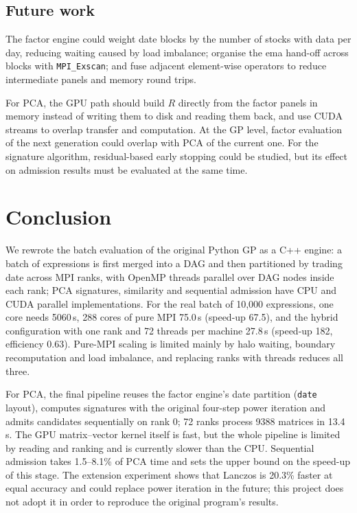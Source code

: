 \documentclass[11pt,a4paper]{article}
\newcommand{\code}[1]{\texttt{#1}}
\begin{document}
\subsection{Future work}
The factor engine could weight date blocks by the number of stocks with data per day, reducing waiting caused by load imbalance; organise the ema hand-off across blocks with \code{MPI\_Exscan}; and fuse adjacent element-wise operators to reduce intermediate panels and memory round trips.

For PCA, the GPU path should build $R$ directly from the factor panels in memory instead of writing them to disk and reading them back, and use CUDA streams to overlap transfer and computation. At the GP level, factor evaluation of the next generation could overlap with PCA of the current one. For the signature algorithm, residual-based early stopping could be studied, but its effect on admission results must be evaluated at the same time.

\section{Conclusion}
We rewrote the batch evaluation of the original Python GP as a C++ engine: a batch of expressions is first merged into a DAG and then partitioned by trading date across MPI ranks, with OpenMP threads parallel over DAG nodes inside each rank; PCA signatures, similarity and sequential admission have CPU and CUDA parallel implementations. For the real batch of 10{,}000 expressions, one core needs 5060\,s, 288 cores of pure MPI 75.0\,s (speed-up 67.5), and the hybrid configuration with one rank and 72 threads per machine 27.8\,s (speed-up 182, efficiency 0.63). Pure-MPI scaling is limited mainly by halo waiting, boundary recomputation and load imbalance, and replacing ranks with threads reduces all three.

For PCA, the final pipeline reuses the factor engine's date partition (\code{date} layout), computes signatures with the original four-step power iteration and admits candidates sequentially on rank 0; 72 ranks process 9388 matrices in 13.4\,s. The GPU matrix--vector kernel itself is fast, but the whole pipeline is limited by reading and ranking and is currently slower than the CPU. Sequential admission takes 1.5--8.1\% of PCA time and sets the upper bound on the speed-up of this stage. The extension experiment shows that Lanczos is 20.3\% faster at equal accuracy and could replace power iteration in the future; this project does not adopt it in order to reproduce the original program's results.
\end{document}

